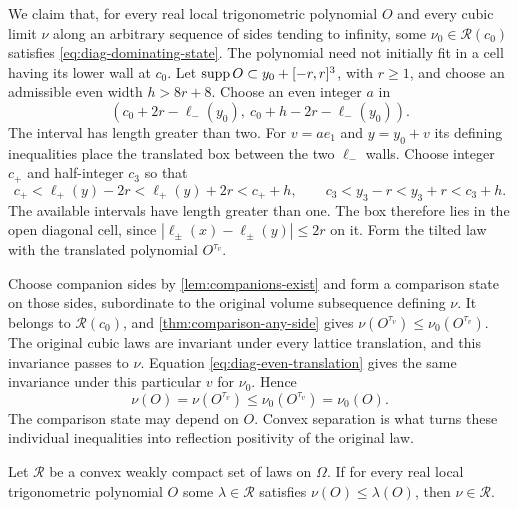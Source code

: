 We claim that, for every real local trigonometric polynomial
$O$ and every cubic limit $\nu$ along an arbitrary sequence of sides tending to infinity, some $\nu_0\in\mathcal R(c_0)$ satisfies
\eqref{eq:diag-dominating-state}. The polynomial need not
initially fit in a cell having its lower wall at $c_0$.
Let $\operatorname{supp} O\subset y_0+[-r,r]^3$, with $r\ge1$, and choose
an admissible even width $h>8r+8$. Choose an even integer
$a$ in
\[
 (c_0+2r-\ell_-(y_0),\ c_0+h-2r-\ell_-(y_0)).
\]
The interval has length greater than two. For $v=ae_1$ and
$y=y_0+v$ its defining inequalities place the translated
box between the two $\ell_-$ walls. Choose integer $c_+$
and half-integer $c_3$ so that
\[
 c_+<\ell_+(y)-2r<\ell_+(y)+2r<c_++h,
 \qquad c_3<y_3-r<y_3+r<c_3+h.
\]
The available intervals have length greater than one.
The box therefore lies in the open diagonal cell, since
$|\ell_\pm(x)-\ell_\pm(y)|\le2r$ on it. Form the tilted
law with the translated polynomial $O^{\tau_v}$.

Choose companion sides by \cref{lem:companions-exist} and form a
comparison state on those sides, subordinate to the original volume
subsequence defining $\nu$. It belongs to $\mathcal R(c_0)$,
and \cref{thm:comparison-any-side} gives
$\nu(O^{\tau_v})\le\nu_0(O^{\tau_v})$. The original cubic
laws are invariant under every lattice translation, and
this invariance passes to $\nu$. Equation
\eqref{eq:diag-even-translation} gives the same invariance
under this particular $v$ for $\nu_0$. Hence
\begin{equation}\label{eq:diag-dominating-state}
 \nu(O)=\nu(O^{\tau_v})
       \le\nu_0(O^{\tau_v})=\nu_0(O).
\end{equation}
The comparison state may depend on $O$. Convex separation
is what turns these individual inequalities into reflection
positivity of the original law.

\begin{lemma}\label{lem:diag-separation}
Let $\mathcal R$ be a convex weakly compact set of laws on
$\Omega$. If for every real local trigonometric polynomial
$O$ some $\lambda\in\mathcal R$ satisfies
$\nu(O)\le\lambda(O)$, then $\nu\in\mathcal R$.
\end{lemma}

